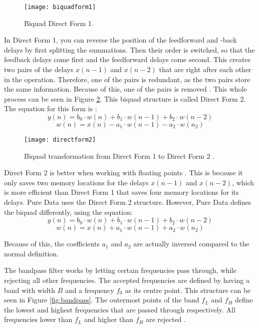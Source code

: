 \begin{figure}
\centering
\texttt{[image: biquadform1]}
\caption{Biquad Direct Form 1.}
\label{fig:biquadform1}
\end{figure}

In Direct Form 1, you can reverse the position of the feedforward and -back delays by first splitting the summations. Then their order is switched, so that the feedback delays come first and the feedforward delays come second. This creates two pairs of the delays \(x(n-1)\) and \(x(n-2)\) that are right after each other in the operation. Therefore, one of the pairs is redundant, as the two pairs store the same information. Because of this, one of the pairs is removed \cite{Redmon2003}. This whole process can be seen in Figure \ref{fig:biquadtransform}. This biquad structure is called Direct Form 2. The equation for this form is \cite{Nederland2016}:
\[y(n) = b_0 \cdot w(n) + b_1 \cdot w(n-1) + b_2 \cdot w(n-2)\]
\[w(n) = x(n) - a_1 \cdot w(n-1) - a_2 \cdot w(n_2)\]

\begin{figure}
\centering
\texttt{[image: directform2]}
\caption{Biquad transformation from Direct Form 1 to Direct Form 2 \cite{Redmon2003}.}
\label{fig:biquadtransform}
\end{figure}

Direct Form 2 is better when working with floating points \cite{Redmon2003}. This is because it only saves two memory locations for the delays \(x(n-1)\) and \(x(n-2)\), which is more efficient than Direct Form 1 that saves four memory locations for its delays. Pure Data uses the Direct Form 2 structure. However, Pure Data defines the biquad differently, using the equation:
\[y(n) = b_0 \cdot w(n) + b_1 \cdot w(n-1) + b_2 \cdot w(n-2)\]
\[w(n) = x(n) + a_1 \cdot w(n-1) + a_2 \cdot w(n_2)\]

Because of this, the coefficients \(a_1\) and \(a_2\) are actually inversed compared to the normal definition.

The bandpass filter works by letting certain frequencies pass through, while rejecting all other frequencies. The accepted frequencies are defined by having a band with width \(B\) and a frequency \(f_0\) as its  centre point. This structure can be seen in Figure \ref{fig:bandpass}. The outermost points of the band \(f_L\) and \(f_H\) define the lowest and highest frequencies that are passed through respectively. All frequencies lower than \(f_L\) and higher than \(f_H\) are rejected \cite{zolzer2011dafx}.

